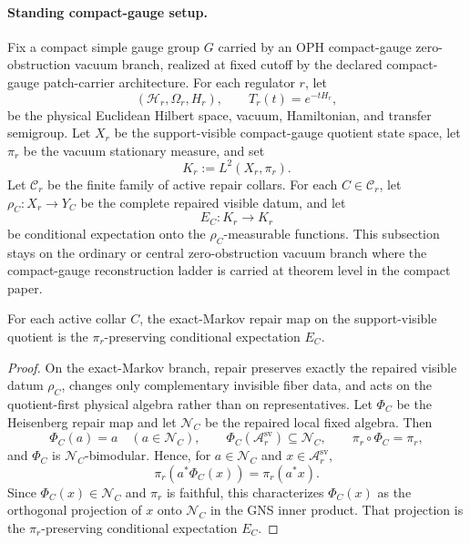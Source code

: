 \paragraph{Standing compact-gauge setup.}
Fix a compact simple gauge group \(G\) carried by an OPH compact-gauge zero-obstruction vacuum
branch, realized at fixed cutoff by the declared compact-gauge patch-carrier architecture. For
each regulator \(r\), let
\[
(\mathcal H_r,\Omega_r,H_r),\qquad T_r(t)=e^{-tH_r},
\]
be the physical Euclidean Hilbert space, vacuum, Hamiltonian, and transfer semigroup. Let
\(X_r\) be the support-visible compact-gauge quotient state space, let \(\pi_r\) be the vacuum
stationary measure, and set
\[
K_r:=L^2(X_r,\pi_r).
\]
Let \(\mathcal C_r\) be the finite family of active repair collars. For each
\(C\in\mathcal C_r\), let \(\rho_C:X_r\to Y_C\) be the complete repaired visible datum, and let
\[
E_C:K_r\to K_r
\]
be conditional expectation onto the \(\rho_C\)-measurable functions. This subsection stays on the
ordinary or central zero-obstruction vacuum branch where the compact-gauge reconstruction ladder is
carried at theorem level in the compact paper.

\begin{proposition}
\label{prop:sv-repair-expectation}
For each active collar \(C\), the exact-Markov repair map on the support-visible quotient is the
\(\pi_r\)-preserving conditional expectation \(E_C\).
\end{proposition}

\begin{proof}
On the exact-Markov branch, repair preserves exactly the repaired visible datum \(\rho_C\), changes
only complementary invisible fiber data, and acts on the quotient-first physical algebra rather
than on representatives. Let \(\Phi_C\) be the Heisenberg repair map and let \(\mathcal N_C\) be
the repaired local fixed algebra. Then
\[
\Phi_C(a)=a\quad(a\in\mathcal N_C),\qquad
\Phi_C(\mathcal A^{\mathrm{sv}}_r)\subseteq\mathcal N_C,\qquad
\pi_r\circ\Phi_C=\pi_r,
\]
and \(\Phi_C\) is \(\mathcal N_C\)-bimodular. Hence, for
\(a\in\mathcal N_C\) and \(x\in\mathcal A^{\mathrm{sv}}_r\),
\[
\pi_r\!\left(a^*\Phi_C(x)\right)=\pi_r(a^*x).
\]
Since \(\Phi_C(x)\in\mathcal N_C\) and \(\pi_r\) is faithful, this characterizes
\(\Phi_C(x)\) as the orthogonal projection of \(x\) onto \(\mathcal N_C\) in the GNS inner
product. That projection is the \(\pi_r\)-preserving conditional expectation \(E_C\).
\end{proof}

